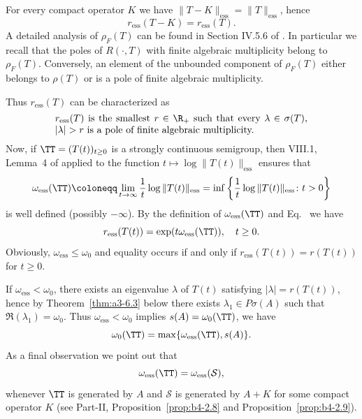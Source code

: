 \begin{example}
For every compact operator $K$ we have $\|T - K\|_{\text{ess}} = \|T\|_{\text{ess}}$, hence
\begin{equation}\label{eq:a3-3.7}
r_{\text{ess}}(T - K) = r_{\text{ess}}(T) .
\end{equation}
A detailed analysis of\/ $\rho_{F}(T)$ can be found in Section IV.5.6 of \textcite{kato:1976}.
In particular we recall that the poles 
of\/ $R(\cdot,T)$ with finite algebraic multiplicity belong to $\rho_{F}(T)$.
Conversely, an element of the unbounded component of\/ $\rho_{F}(T)$ either belongs to $\rho(T)$ or is a pole of finite algebraic multiplicity.

Thus $r_{\text{ess}}(T)$ can be characterized as
\begin{equation}\label{eq:a3-3.8}
\begin{minipage}{.75\textwidth}
$r_{\text{ess}}(T) $ is the smallest   $r \in \R_{+}$    such that every   
$\lambda \in \sigma(T)$, $ |\lambda| > r $  is a pole of finite algebraic multiplicity. 
\end{minipage}
\end{equation}
Now, if\/ $\TT = (T(t))_{t \geq 0}$ is a strongly continuous semigroup, then VIII.1, Lemma~4 of \textcite{dunfordschwartz:1958} applied to the function $t \mapsto \log \|T(t)\|_{\text{ess}}$ ensures that
\begin{equation}\label{eq:a3-3.9}
\omega_{\text{ess}}(\TT) \coloneqq \lim_{t \to \infty} \frac{1}{t} \log\|T(t)\|_{\text{ess}} = \inf \left\{\frac{1}{t} \log\|T(t)\|_{\text{ess}} \colon t > 0\right\}
\end{equation}
is well defined (possibly $-\infty$).
By the definition of\/ $\omega_{\text{ess}}(\TT)$ and Eq.~ we have
\begin{equation}\label{eq:a3-3.10}
r_{\text{ess}}(T(t)) = \exp(t\omega_{\text{ess}}(\TT)), \quad t \geq 0 .
\end{equation}
Obviously, $\omega_{\text{ess}} \leq \omega_{0}$ and equality occurs if and only if\/ $r_{\text{ess}}(T(t)) = r(T(t))$ for $t \geq 0$.

If\/ $\omega_{\text{ess}} < \omega_{0}$, there exists an eigenvalue $\lambda$ of\/ $T(t)$ satisfying $|\lambda| = r(T(t))$, hence by Theorem~\ref{thm:a3-6.3} below there exists $\lambda_{1} \in P\sigma(A)$ such that $\Re(\lambda_{1}) = \omega_{0}$.
Thus $\omega_{\text{ess}} < \omega_{0}$ implies $s(A) = \omega_{0}(\TT)$, \ie we have
\begin{equation}\label{eq:a3-3.11}
\omega_{0}(\TT) = \max\{\omega_{\text{ess}}(\TT),s(A)\} .
\end{equation}
As a final observation we point out that
\begin{equation}\label{eq:a3-3.12}
\omega_{\text{ess}}(\TT) = \omega_{\text{ess}}({\mathcal{S}}) ,
\end{equation}
whenever $\TT$ is generated by $A$ and $\mathcal{S}$ is generated by $A + K$ for some compact operator $K$ 
(see Part-II, Proposition~\ref{prop:b4-2.8} and Proposition~\ref{prop:b4-2.9}).
\end{example}
